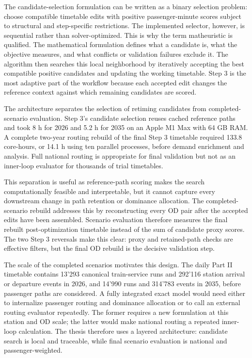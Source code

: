 \documentclass[conference]{IEEEtran}
\begin{document}
The candidate-selection formulation can be written as a binary selection problem: choose compatible timetable edits with positive passenger-minute scores subject to structural and step-specific restrictions. The implemented selector, however, is sequential rather than solver-optimized. This is why the term matheuristic is qualified. The mathematical formulation defines what a candidate is, what the objective measures, and what conflicts or validation failures exclude it. The algorithm then searches this local neighborhood by iteratively accepting the best compatible positive candidates and updating the working timetable. Step 3 is the most adaptive part of the workflow because each accepted edit changes the reference context against which remaining candidates are scored.

The architecture separates the selection of retiming candidates from completed-scenario evaluation. Step 3's candidate selection reuses cached reference paths and took 8 h for 2026 and 5.2 h for 2035 on an Apple M1 Max with 64 GB RAM. A complete two-year routing rebuild of the final Step 3 timetable required 133.8 core-hours, or 14.1 h using ten parallel processes, before demand enrichment and analysis. Full national routing is appropriate for final validation but not as an inner-loop evaluator for thousands of trial timetables.

This separation is useful as reference-path scoring makes the search computationally feasible and interpretable, but it cannot capture every downstream change in path retention or dominance allocation. The completed-scenario rebuild addresses this by reconstructing every OD pair after the accepted edits have been assembled. Scenario evaluation therefore measures the final rebuilt post-optimization timetable instead of the sum of candidate proxy scores. The two Step 3 reversals make this clear: proxy and retained-path checks are effective filters, but the final OD rebuild is the decisive validation step.

The scale of the completed scenarios motivates this design. The daily Part II timetable contains 13'293 canonical train-service runs and 292'116 station arrival or departure events in 2026, and 14'990 runs and 314'783 events in 2035, before passenger paths are considered. A fully integrated exact model would need either to internalize passenger routing and dominance allocation or to call an external routing evaluator repeatedly. The former requires a new formulation at this station and OD scale; the latter would make national routing a repeated inner-loop calculation. The thesis therefore uses a layered architecture: candidate search is local and traceable, while final scenario evaluation is national and passenger-weighted.
\end{document}
